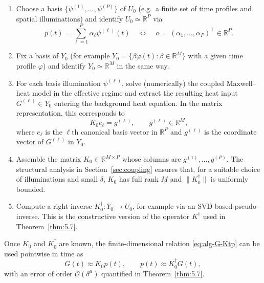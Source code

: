 \documentclass[11pt,a4paper]{article}
\numberwithin{equation}{section}
\theoremstyle{definition}
\newcommand{\R}{\mathbb{R}}
\newcommand{\1}{\mathbbm{1}}
\begin{document}
\begin{enumerate}
  \item Choose a basis $\{\psi^{(1)},\dots,\psi^{(P)}\}$ of $U_0$ (e.g.\ a
  finite set of time profiles and spatial illuminations) and identify
  $U_0\simeq\R^P$ via
  \[
    p(t) = \sum_{\ell=1}^P \alpha_\ell \psi^{(\ell)}(t)
    \quad\Longleftrightarrow\quad
    \alpha = (\alpha_1,\dots,\alpha_P)^\top\in\R^P.
  \]

  \item Fix a basis of $Y_0$ (for example $Y_0=\{\beta\varphi(t):\beta\in\R^M\}$
  with a given time profile $\varphi$) and identify $Y_0\simeq\R^M$ in the
  same way.

  \item For each basis illumination $\psi^{(\ell)}$, solve (numerically) the
  coupled Maxwell--heat model in the effective regime and extract the
  resulting heat input $G^{(\ell)}\in Y_0$ entering the background heat
  equation. In the matrix representation, this corresponds to
  \[
    K_0 e_\ell = g^{(\ell)},\qquad
    g^{(\ell)}\in\R^M,
  \]
  where $e_\ell$ is the $\ell$th canonical basis vector in $\R^P$ and
  $g^{(\ell)}$ is the coordinate vector of $G^{(\ell)}$ in $Y_0$.

  \item Assemble the matrix $K_0\in\R^{M\times P}$ whose columns are
  $g^{(1)},\dots,g^{(P)}$. The structural analysis in Section~\ref{sec:coupling} ensures that,
  for a suitable choice of illuminations and small $\delta$, $K_0$ has full
  rank $M$ and $\|K_0^\dagger\|$ is uniformly bounded.

  \item Compute a right inverse $K_0^\dagger:Y_0\to U_0$, for example via an
  SVD-based pseudo-inverse. This is the constructive version of the operator
  $K^\dagger$ used in Theorem~\ref{thm:5.7}.
\end{enumerate}
Once $K_0$ and $K_0^\dagger$ are known, the finite-dimensional relation
\eqref{eq:alg-G-Ktp} can be used pointwise in time as
\[
  G(t) \approx K_0 p(t),\qquad
  p(t) \approx K_0^\dagger G(t),
\]
with an error of order $\mathcal{O}(\delta^\mu)$ quantified in
Theorem~\ref{thm:5.7}.

\end{document}
